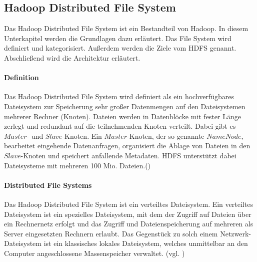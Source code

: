 \subsection{Hadoop Distributed File System}
Das Hadoop Distributed File System ist ein Bestandteil von Hadoop. In diesem Unterkapitel werden die Grundlagen dazu erläutert. Das File System wird definiert und kategorisiert. Außerdem werden die Ziele vom HDFS genannt. Abschließend wird die Architektur erläutert.

\paragraph{Definition}$\;$ \\
Das Hadoop Distributed File System wird definiert als ein \glqq hochverfügbares Dateisystem zur Speicherung sehr großer Datenmengen auf den Dateisystemen mehrerer Rechner (Knoten). Dateien werden in Datenblöcke mit fester Länge zerlegt und redundant auf die teilnehmenden Knoten verteilt. Dabei gibt es $Master$- und $Slave$-Knoten. Ein $Master$-Knoten, der so genannte $NameNode$, bearbeitet eingehende Datenanfragen, organisiert die Ablage von Dateien in den $Slave$-Knoten und speichert anfallende Metadaten. HDFS unterstützt dabei Dateisysteme mit mehreren 100 Mio. Dateien.\grqq (\cite{defhad})

\paragraph{Distributed File Systems}$\;$ \\
Das Hadoop Distributed File System ist ein verteiltes Dateisystem. Ein verteiltes Dateisystem ist ein spezielles Dateisystem, mit dem der Zugriff auf Dateien über ein Rechnernetz erfolgt und das Zugriff und Dateienspeicherung auf mehreren als Server eingesetzten Rechnern erlaubt. Das Gegenstück zu solch einem Netzwerk-Dateisystem ist ein klassisches lokales Dateisystem, welches unmittelbar an den Computer angeschlossene Massenspeicher verwaltet. (vgl. \cite{distributfs})

